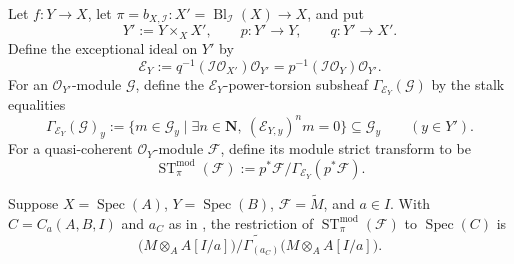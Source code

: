 \begin{definition}
  \label{def:nagata-module-strict-transform}

  Let $f\colon Y\to X$, let
  $\pi=b_{X,\mathcal I}\colon X'=\operatorname{Bl}_{\mathcal I}(X)\to X$,
  and put
  \[
    Y':=Y\times_XX',\qquad
    p\colon Y'\to Y,\qquad q\colon Y'\to X'.
  \]
  Define the exceptional ideal on $Y'$ by
  \[
    \mathcal E_Y
      :=q^{-1}(\mathcal I\mathcal O_{X'})\mathcal O_{Y'}
      =p^{-1}(\mathcal I\mathcal O_Y)\mathcal O_{Y'}.
  \]
  For an $\mathcal O_{Y'}$-module $\mathcal G$, define the
  $\mathcal E_Y$-power-torsion subsheaf $\Gamma_{\mathcal E_Y}(\mathcal G)$
  by the stalk equalities
  \[
    \Gamma_{\mathcal E_Y}(\mathcal G)_y
      :=\{m\in\mathcal G_y\mid
           \exists n\in\mathbf N,\ (\mathcal E_{Y,y})^n m=0\}
      \subseteq\mathcal G_y
      \qquad(y\in Y').
  \]
  For a quasi-coherent $\mathcal O_Y$-module $\mathcal F$, define its module
  strict transform to be
  \[
    \operatorname{ST}^{\mathrm{mod}}_\pi(\mathcal F)
      :=p^*\mathcal F\big/
         \Gamma_{\mathcal E_Y}(p^*\mathcal F).
  \]
\end{definition}

\begin{lemma}
  \label{lemma:nagata-module-strict-transform-chart}

  Suppose $X=\operatorname{Spec}(A)$, $Y=\operatorname{Spec}(B)$,
  $\mathcal F=\widetilde M$, and $a\in I$.  With
  $C=C_a(A,B,I)$ and $a_C$ as in
  , the restriction
  of $\operatorname{ST}^{\mathrm{mod}}_\pi(\mathcal F)$ to
  $\operatorname{Spec}(C)$ is
  \[
    \widetilde{\bigl(M\otimes_AA[I/a]\bigr)\big/
      \Gamma_{(a_C)}\bigl(M\otimes_AA[I/a]\bigr)}.
  \]
\end{lemma}

